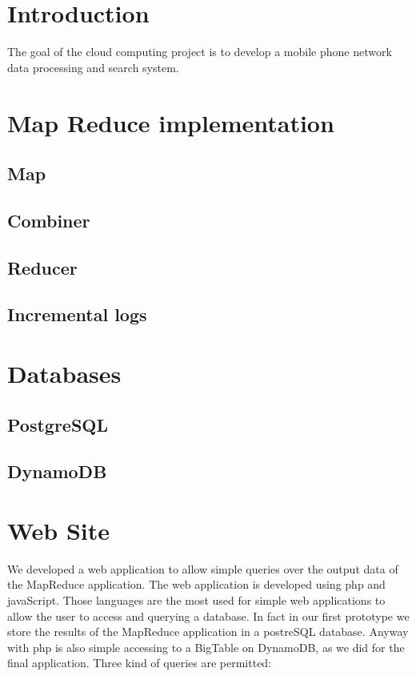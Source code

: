 \documentclass{article}
\begin{document}
\onehalfspacing %
\parskip 4pt %




\tableofcontents

\newpage

\section*{Introduction}
The goal of the cloud computing project is to develop a mobile phone network data processing
and search system.

\section{Map Reduce implementation }
\subsection{Map}
\subsection{Combiner}
\subsection{Reducer}
\subsection{Incremental logs}

\section{Databases}
\subsection{PostgreSQL}
\subsection{DynamoDB}
\section{Web Site}
We developed a web application to allow simple queries over the output data of the MapReduce application.
The web application is developed using php and javaScript. 
Those languages are the most used for simple web applications to allow the user to access and querying a 
database. In fact in our first prototype we store the results of the MapReduce application in a postreSQL database.
Anyway with php is also simple accessing to a BigTable on DynamoDB, as we did for the final application.
Three kind of queries are permitted: 
\end{document}
